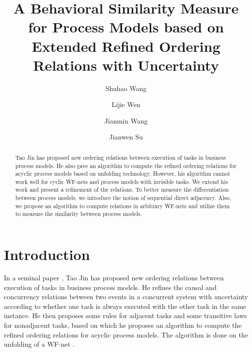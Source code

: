 \documentclass{llncs}
\begin{document}
\frontmatter 
\pagestyle{headings}

\mainmatter
\title{A Behavioral Similarity Measure for Process Models based on Extended Refined Ordering Relations with Uncertainty}

\author[$\$$]{Shuhao Wang}
\author[$\$$]{Lijie Wen}
\author[$\$$]{Jianmin Wang}
\author[$\#$]{Jianwen Su}
\institute{}

\maketitle

\begin{abstract}
Tao Jin has proposed new ordering relations between execution of tasks in business process models. He also gave an algorithm to compute the refined ordering relations for acyclic process models based on unfolding technology. However, his algorithm cannot work well for cyclic WF-nets and process models with invisible tasks. We extend his work and present a refinement of the relations. To better measure the differentiation between process models, we introduce the notion of sequential direct adjacency. Also, we propose an algorithm to compute relations in arbitrary WF-nets and utilize them to measure the similarity between process models.
\end{abstract}

\section{Introduction}\label{sec:introduction}

In a seminal paper \cite{jin2014computing}, Tao Jin has proposed new ordering relations between execution of tasks in business process models. He refines the causal and concurrency relations between two events in a concurrent system with uncertainty according to whether one task is always executed with the other task in the same instance. He then proposes some rules for adjacent tasks and some transitive laws for nonadjacent tasks, based on which he proposes an algorithm to compute the refined ordering relations for acyclic process models. The algorithm is done on the unfolding of a WF-net \cite{mcmillan1995technique,esparza1996improvement}.
\end{document}
